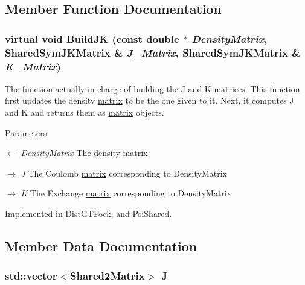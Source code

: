 \subsection{Member Function Documentation}
\hypertarget{classJKBuilder_1_1JKFactory_ae253b309dafe3ce003fdabfd315318b8}{
\subsubsection[{BuildJK}]{\setlength{\rightskip}{0pt plus 5cm}virtual void BuildJK (const double $\ast$ {\em DensityMatrix}, \/  {\bf SharedSymJKMatrix} \& {\em J\_\-Matrix}, \/  {\bf SharedSymJKMatrix} \& {\em K\_\-Matrix})}}
\label{classJKBuilder_1_1JKFactory_ae253b309dafe3ce003fdabfd315318b8}


The function actually in charge of building the J and K matrices. This function first updates the density \hyperlink{classJKBuilder_1_1matrix}{matrix} to be the one given to it. Next, it computes J and K and returns them as \hyperlink{classJKBuilder_1_1matrix}{matrix} objects.


\begin{DoxyParams}{Parameters}
\item[\mbox{$\leftarrow$} {\em DensityMatrix}]The density \hyperlink{classJKBuilder_1_1matrix}{matrix} \item[\mbox{$\rightarrow$} {\em J}]The Coulomb \hyperlink{classJKBuilder_1_1matrix}{matrix} corresponding to DensityMatrix \item[\mbox{$\rightarrow$} {\em K}]The Exchange \hyperlink{classJKBuilder_1_1matrix}{matrix} corresponding to DensityMatrix \end{DoxyParams}


Implemented in \hyperlink{classGTFock_1_1DistGTFock_aea85d0b3d84e8e52819e8a15201e078a}{DistGTFock}, and \hyperlink{classJKBuilder_1_1PsiShared_aa5f73a8109ec88464262262164feda1e}{PsiShared}.

\subsection{Member Data Documentation}
\hypertarget{classJKBuilder_1_1SharedFactory_afabc3015deddc9247c1c2822431a724f}{
\subsubsection[{J}]{\setlength{\rightskip}{0pt plus 5cm}std::vector$<${\bf Shared2Matrix}$>$ {\bf J}}}
\label{classJKBuilder_1_1SharedFactory_afabc3015deddc9247c1c2822431a724f}


